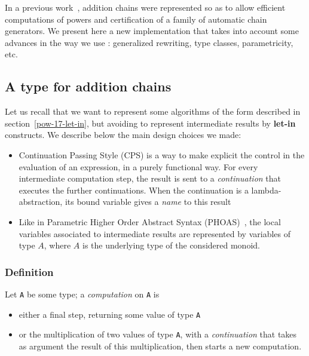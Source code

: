 In a previous work~\cite{DBLP:journals/ita/BrlekCHM95, DBLP:conf/tapsoft/BrlekCS91,AdditionsContrib},  addition chains were represented so as to allow
efficient computations of powers and certification of a family of
automatic chain generators.
  We present here a new implementation that takes into account some
advances in the way we use \coq{}: generalized rewriting, type classes,
parametricity, etc.


\subsection{A type for addition chains}

Let us recall that we want to represent some algorithms of the form
described in section~\ref{pow-17-let-in}, but avoiding to represent
intermediate results by \textbf{let-in}  constructs.
We describe below the main design choices we made:

\begin{itemize}
\item Continuation Passing Style (CPS)  \cite{reynolds93}
is a way to make explicit the 
     control in the evaluation of an expression, in a purely functional way. 
    For every intermediate computation step, the result is sent
    to a \emph{continuation} that executes the further continuations.
   When the continuation is a lambda-abstraction, its bound variable 
   gives a \emph{name} to this result


  
\item Like in Parametric Higher Order Abstract Syntax (PHOAS)~\cite{PHOAS}, 
     the local variables associated to intermediate results are
     represented by variables of  type $A$, where $A$ is the underlying type
  of the considered monoid.
\end{itemize}


\subsubsection{Definition}
\label{computation-def}
Let  \texttt{A} be some type;  a \emph{computation} on \texttt{A} is 
\begin{itemize}
\item  either a final step, returning some value of type \texttt{A}
\item or the multiplication of two values of type  \texttt{A}, with a  \emph{continuation}
  that takes as argument the result of this multiplication, then starts a new
  computation.
\end{itemize}
  
